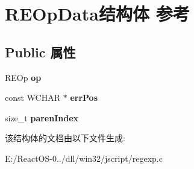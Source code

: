 \hypertarget{struct_r_e_op_data}{}\section{R\+E\+Op\+Data结构体 参考}
\label{struct_r_e_op_data}
\subsection*{Public 属性}
\begin{DoxyCompactItemize}
\item 
\mbox{\label{struct_r_e_op_data_a8a2f9f10f6ba656c2094f32760ce0ea3}} 
R\+E\+Op {\bfseries op}
\item 
\mbox{\label{struct_r_e_op_data_a649ad97e4121db9cddc615338feb28bb}} 
const W\+C\+H\+AR $\ast$ {\bfseries err\+Pos}
\item 
\mbox{\label{struct_r_e_op_data_ac76540305720f32bb5101f27d219caee}} 
size\+\_\+t {\bfseries paren\+Index}
\end{DoxyCompactItemize}


该结构体的文档由以下文件生成\+:\begin{DoxyCompactItemize}
\item 
E\+:/\+React\+O\+S-\/0../dll/win32/jscript/regexp.\+c\end{DoxyCompactItemize}

